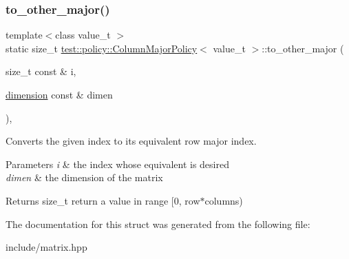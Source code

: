 \subsubsection{\texorpdfstring{to\_other\_major()}{to\_other\_major()}}
{\footnotesize\ttfamily template$<$class value\+\_\+t $>$ \\
static size\+\_\+t \mbox{\hyperlink{structtest_1_1policy_1_1ColumnMajorPolicy}{test\+::policy\+::\+Column\+Major\+Policy}}$<$ value\+\_\+t $>$\+::to\+\_\+other\+\_\+major (\begin{DoxyParamCaption}\item[{size\+\_\+t const \&}]{i,  }\item[{\mbox{\hyperlink{structtest_1_1dimension}{dimension}} const \&}]{dimen }\end{DoxyParamCaption})\hspace{0.3cm}{\ttfamily [inline]}, {\ttfamily [static]}}



Converts the given index to its equivalent row major index. 


\begin{DoxyParams}{Parameters}
{\em i} & the index whose equivalent is desired \\
\hline
{\em dimen} & the dimension of the matrix \\
\hline
\end{DoxyParams}
\begin{DoxyReturn}{Returns}
size\+\_\+t return a value in range \mbox{[}0, row$\ast$columns) 
\end{DoxyReturn}


The documentation for this struct was generated from the following file\+:\begin{DoxyCompactItemize}
\item 
include/matrix.\+hpp\end{DoxyCompactItemize}
